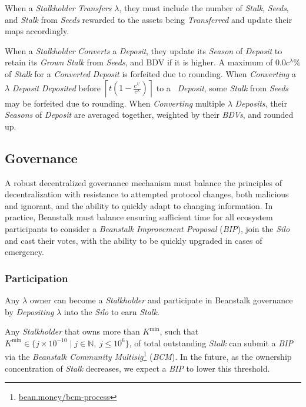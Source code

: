 \documentclass[tikz]{article}
\newcommand{\term}[1]{\textsl{#1}}
\newcommand{\fref}[1]{\footnote{\href{http://#1}{#1}}}
\newcommand{\Bean}{} %
\begin{document}
When a \term{Stalkholder} \term{Transfers} $\lambda$, they must include the number of \term{Stalk}, \term{Seeds}, and \term{Stalk} from \term{Seeds} rewarded to the assets being \term{Transferred} and update their maps accordingly.

When a \term{Stalkholder} \term{Converts} a \term{Deposit}, they update its \term{Season} of \term{Deposit} to retain its \term{Grown} \term{Stalk} from \term{Seeds}, and BDV if it is higher. A maximum of $0.0c^\lambda\%$ of \term{Stalk} for a \term{Converted} \term{Deposit} is forfeited due to rounding. When \term{Converting} a $\lambda$ \term{Deposit} \term{Deposited} before $\left\lceil t \left(1 - \frac{c^{\lambda'}}{c^{\lambda}}\right) \right\rceil$ to a \Bean\ \term{Deposit}, some \term{Stalk} from \term{Seeds} may be forfeited due to rounding. When \term{Converting} multiple $\lambda$ \term{Deposits}, their \term{Seasons} of \term{Deposit} are averaged together, weighted by their \term{BDVs}, and rounded up.

\subsection{Governance}
\vspace*{-1mm}
A robust decentralized governance mechanism must balance the principles of decentralization with resistance to attempted protocol changes, both malicious and ignorant, and the ability to quickly adapt to changing information. In practice, Beanstalk must balance ensuring sufficient time for all ecosystem participants to consider a \term{Beanstalk Improvement Proposal} (\term{BIP}), join the \term{Silo} and cast their votes, with the ability to be quickly upgraded in cases of emergency. 

\subsubsection{Participation}
\vspace*{-1mm}
Any $\lambda$ owner can become a \term{Stalkholder} and participate in Beanstalk governance by \term{Depositing} $\lambda$ into the \term{Silo} to earn \term{Stalk}.

Any \term{Stalkholder} that owns more than $K^{\text{min}}$, such that $K^{\text{min}} \in \{j \times 10^{-10} \mid j \in \mathbb{N},\ j \leq 10^{6} \}$, of total outstanding \term{Stalk} can submit a \term{BIP} via the \term{Beanstalk Community Multisig}\fref{bean.money/bcm-process} (\term{BCM}). In the future, as the ownership concentration of \term{Stalk} decreases, we expect a \term{BIP} to lower this threshold.
\end{document}
